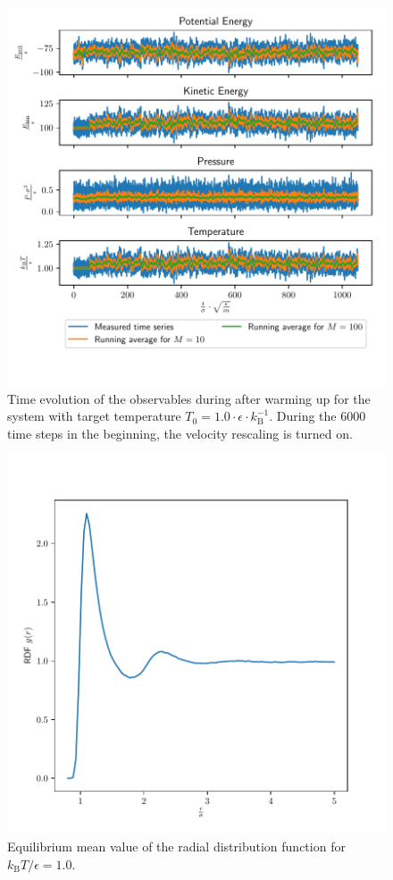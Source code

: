 \documentclass[a4paper,10pt,bibtotoc]{scrartcl}
\begin{document}
\begin{figure}
        \centering
        \includegraphics[width=\linewidth]{equi1.pdf}
    \caption{Time evolution of the observables during after warming up for the system with target temperature $T_0 = 1.0\cdot \epsilon\cdot k_\mathrm{B}^{-1}$. During the 6000 time steps in the beginning, the velocity rescaling is turned on.}
    \label{fig:figy0}
\end{figure}
\begin{figure}
        \centering
        \includegraphics[width=\linewidth]{rdf1.pdf}
    \caption{Equilibrium mean value of the radial distribution function for $k_\mathrm{B}T/\epsilon=1.0$.}
    \label{fig:figy1}
\end{figure}
\end{document}
